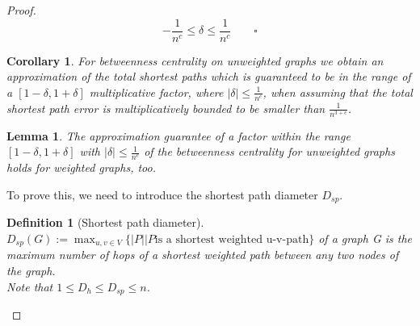 \documentclass[11pt]{article}
\newtheorem{lemma}[theorem]{Lemma}
\newtheorem{corollary}[theorem]{Corollary}
\newtheorem{definition}[theorem]{Definition}
\newcommand{\todo}[1]{{\begin{small}\sffamily \color{red}TODO:  #1 \end{small}}}
\newcommand{\todoI}[1]{}\newcommand{\blueI}[1]{}
\newcommand{\blue}[1]{{ \color{blue} #1 }}
\newif\iffull
\begin{document}
\begin{proof}
\begin{equation}
-\frac{1}{n^c}\leq\delta\leq\frac{1}{n^c} \qquad \square
\label{eq:delta}
\end{equation}

\begin{corollary}
For betweenness centrality on unweighted graphs we obtain an approximation of the total shortest paths which is guaranteed to be in the range of a $[1-\delta,1+\delta]$ multiplicative factor, where $|\delta|\leq\frac{1}{n^c}$, when assuming that the total shortest path error is multiplicatively bounded to be smaller than $\frac{1}{n^{3+c}}$.
\label{cor:tsperrunw}
\end{corollary}
\todoI{
\begin{proof}
The Error Bound \eqref{eq:delta} holds for the dependencies calculated in Algorithm \ref{alg:BC_g}, Line \ref{line:dep1bc} and \ref{line:depbc}. By adding multiple dependencies, in Line \ref{line:sumsbc} of the same algorithm, the error bounds do not change. Neither do they change in Algorithm\iffull~\ref{alg:BC_setup_controlling}\fi~\textsc{BCsetup}, Line \ref{line:scalebc}, by scaling up the dependencies of $S$ on $u$ to the approximated betweenness centrality $BC(u)$. This is true, as in sumations and when scaling equations, the multiplicative error can simply \todo{be factored out -- what does this mean?}. \blue{$BC_{unscaled}=OPT*\varepsilon$ and $BC_{scaled}=\frac{k*BC_{unscaled}}{n}$, it holds $BC_{scaled}=\frac{k*OPT*\varepsilon}{n}=\frac{k*OPT}{n}*\varepsilon=BC_{OPT}*\varepsilon$, d.h. $ 
\varepsilon$ aendert sich nicht}
\label{lemma:tsperrw}
\end{proof}
}


\begin{lemma}
The approximation guarantee of a factor within the range $[1-\delta, 1+\delta]$ with $|\delta|\leq\frac{1}{n^c}$ of the betweenness centrality for unweighted graphs holds for weighted graphs, too.
\label{lemma:shortesp:weighted}
\end{lemma}
To prove this, we need to introduce the shortest path diameter $D_{sp}$.
\begin{definition}[Shortest path diameter]
$D_{sp}(G):=\max_{u,v\in V}\{|P||P \text{is a shortest weighted u-v-path}\}$ of a graph G is the maximum number of hops of a shortest weighted path between any two nodes of the graph.\\
Note that $1\leq D_h\leq D_{sp}\leq n$.
\label{def:diamsp}
\end{definition}


\end{proof}
\end{document}
